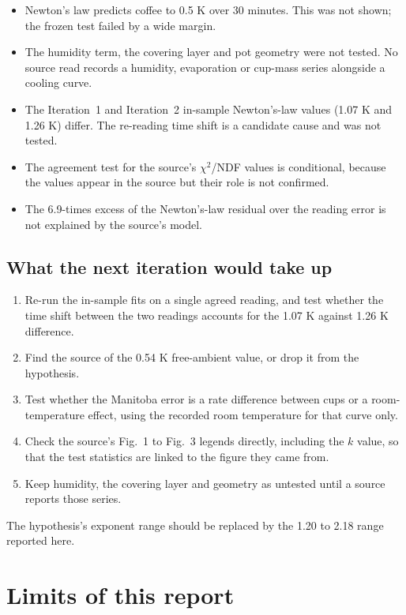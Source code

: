 \documentclass[11pt,letterpaper]{article}
\begin{document}
\begin{itemize}
\item Newton's law predicts coffee to 0.5 K over 30 minutes. This was not shown; the frozen test failed by a wide margin.
\item The humidity term, the covering layer and pot geometry were not tested. No source read records a humidity, evaporation or cup-mass series alongside a cooling curve.
\item The Iteration~1 and Iteration~2 in-sample Newton's-law values (1.07 K and 1.26 K) differ. The re-reading time shift is a candidate cause and was not tested.
\item The agreement test for the source's $\chi^2$/NDF values is conditional, because the values appear in the source but their role is not confirmed.
\item The 6.9-times excess of the Newton's-law residual over the reading error is not explained by the source's model.
\end{itemize}

\subsection{What the next iteration would take up}

\begin{enumerate}
\item Re-run the in-sample fits on a single agreed reading, and test whether the time shift between the two readings accounts for the 1.07 K against 1.26 K difference.
\item Find the source of the 0.54 K free-ambient value, or drop it from the hypothesis.
\item Test whether the Manitoba error is a rate difference between cups or a room-temperature effect, using the recorded room temperature for that curve only.
\item Check the source's Fig.~1 to Fig.~3 legends directly, including the $k$ value, so that the test statistics are linked to the figure they came from.
\item Keep humidity, the covering layer and geometry as untested until a source reports those series.
\end{enumerate}

The hypothesis's exponent range should be replaced by the 1.20 to 2.18 range reported here.

\section{Limits of this report}
\end{document}
